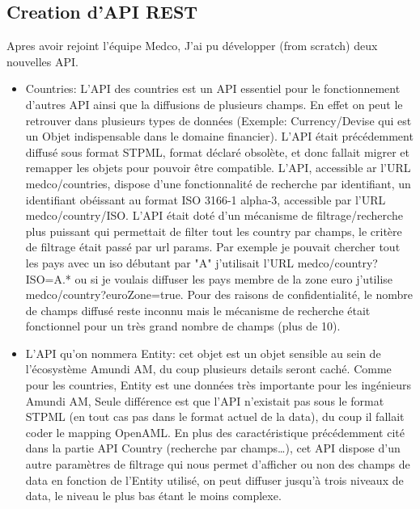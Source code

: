 \subsection{Creation d'API REST}
\par Apres avoir rejoint l'équipe Medco, J'ai pu développer (from scratch) deux nouvelles API.\\
\begin{itemize}
    \item Countries: L'API des countries est un API essentiel pour le fonctionnement d'autres API ainsi que la diffusions de plusieurs champs. En effet on peut le retrouver dans plusieurs types de données (Exemple: Currency/Devise qui est un Objet indispensable dans le domaine financier). L'API était précédemment diffusé sous format STPML, format déclaré obsolète, et donc fallait migrer et remapper les objets pour pouvoir être compatible. L'API, accessible ar l'URL medco/countries, dispose d'une fonctionnalité de recherche par identifiant, un identifiant obéissant au format ISO 3166-1 alpha-3, accessible par l'URL medco/country/ISO. L'API était doté d'un mécanisme de filtrage/recherche plus puissant qui permettait de filter tout les country par champs, le critère de filtrage était passé par url params. Par exemple je pouvait chercher tout les pays avec un iso débutant par "A" j'utilisait l'URL medco/country?ISO=A.* ou si je voulais diffuser les pays membre de la zone euro j'utilise medco/country?euroZone=true. Pour des raisons de confidentialité, le nombre de champs diffusé reste inconnu mais le mécanisme de recherche était fonctionnel pour un très grand nombre de champs (plus de 10). \\
    \item L'API qu'on nommera Entity: cet objet est un objet sensible au sein de l'écosystème Amundi AM, du coup plusieurs details seront caché. Comme pour les countries, Entity est une données très importante pour les ingénieurs Amundi AM, Seule différence est que l'API n'existait pas sous le format STPML (en tout cas pas dans le format actuel de la data), du coup il fallait coder le mapping OpenAML. En plus des caractéristique précédemment cité dans la partie API Country (recherche par champs\dots), cet API dispose d'un autre paramètres de filtrage qui nous permet d'afficher ou non des champs de data en fonction de l'Entity utilisé, on peut diffuser jusqu'à trois niveaux de data, le niveau le plus bas étant le moins complexe. \\
\end{itemize}
